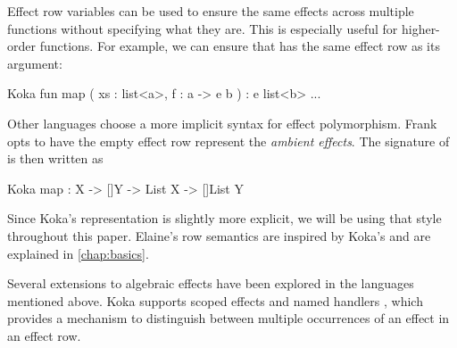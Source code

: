 Effect row variables can be used to ensure the same effects across multiple functions without specifying what they are. This is especially useful for higher-order functions. For example, we can ensure that  has the same effect row as its argument:
\begin{lst}{Koka}
fun map ( xs : list<a>, f : a -> e b ) : e list<b>
    ...
\end{lst}

Other languages choose a more implicit syntax for effect polymorphism. Frank \autocite{lindley_be_2017} opts to have the empty effect row represent the \emph{ambient effects}. The signature of  is then written as
\begin{lst}{Koka}
map : {X -> []Y} -> List X -> []List Y
\end{lst}
Since Koka's representation is slightly more explicit, we will be using that style throughout this paper. Elaine's row semantics are inspired by Koka's and are explained in \cref{chap:basics}.

Several extensions to algebraic effects have been explored in the languages mentioned above. Koka supports scoped effects and named handlers \autocite{xie_first-class_2022}, which provides a mechanism to distinguish between multiple occurrences of an effect in an effect row.
